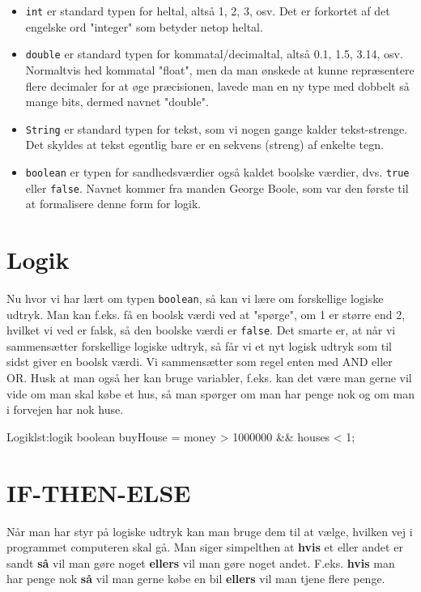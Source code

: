 \begin{itemize}
	\item \texttt{int} er standard typen for heltal, altså 1, 2, 3, osv. Det er forkortet af det engelske ord "integer" som betyder netop heltal.
	\item \texttt{double} er standard typen for kommatal/decimaltal, altså 0.1, 1.5, 3.14, osv. Normaltvis hed kommatal "float", men da man ønskede at kunne repræsentere flere decimaler for at øge præcisionen, lavede man en ny type med dobbelt så mange bits, dermed navnet "double".
	\item \texttt{String} er standard typen for tekst, som vi nogen gange kalder tekst-strenge. Det skyldes at tekst egentlig bare er en sekvens (streng) af enkelte tegn.
	\item \texttt{boolean} er typen for sandhedsværdier også kaldet boolske værdier, dvs. \texttt{true} eller \texttt{false}. Navnet kommer fra manden George Boole, som var den første til at formalisere denne form for logik.
\end{itemize}

\section{Logik}
Nu hvor vi har lært om typen \texttt{boolean}, så kan vi lære om forskellige logiske udtryk. Man kan f.eks. få en boolsk værdi ved at "spørge", om 1 er større end 2, hvilket vi ved er falsk, så den boolske værdi er \texttt{false}. Det smarte er, at når vi sammensætter forskellige logiske udtryk, så får vi et nyt logisk udtryk som til sidst giver en boolsk værdi. Vi sammensætter som regel enten med AND eller OR. Husk at man også her kan bruge variabler, f.eks. kan det være man gerne vil vide om man skal købe et hus, så man spørger om man har penge nok og om man i forvejen har nok huse.

\begin{JavaCode}{Logik}{lst:logik}
	boolean buyHouse = money > 1000000 && houses < 1;
\end{JavaCode}

\section{IF-THEN-ELSE}
Når man har styr på logiske udtryk kan man bruge dem til at vælge, hvilken vej i programmet computeren skal gå. Man siger simpelthen at \textbf{hvis} et eller andet er sandt \textbf{så} vil man gøre noget \textbf{ellers} vil man gøre noget andet. F.eks. \textbf{hvis} man har penge nok \textbf{så} vil man gerne købe en bil \textbf{ellers} vil man tjene flere penge.


